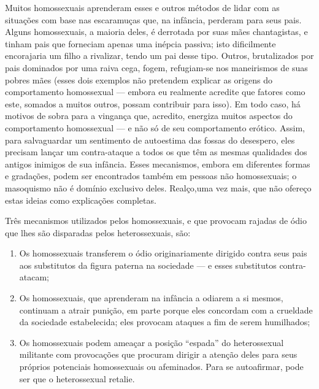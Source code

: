 Muitos homossexuais aprenderam esses e outros métodos de lidar com
as situações com base nas escaramuças que, na infância, perderam para
seus pais.\idxrelpchomo{} Alguns homossexuais, a maioria deles, é derrotada por suas
mães\idxmaeshomo{} chantagistas,\idxhomosexpe{} e tinham pais que forneciam apenas uma inépcia
passiva; isto dificilmente encorajaria um filho a rivalizar, tendo um
pai desse tipo. Outros, brutalizados por pais dominados por uma raiva
cega, fogem, refugiam-se nos maneirismos de suas pobres mães (esses
dois exemplos não pretendem explicar as origens do comportamento
homossexual --- embora eu realmente acredite que fatores como este,
somados a muitos outros, possam contribuir para isso). Em todo caso,
há motivos de sobra para a vingança que,\idxvingahom{} acredito, energiza muitos
aspectos do comportamento homossexual --- e não só de seu
comportamento erótico. Assim, para salvaguardar um sentimento de
autoestima das fossas do desespero, eles precisam lançar um
contra-ataque a todos os que têm as mesmas qualidades dos antigos
inimigos de sua infância. Esses mecanismos, embora em diferentes formas
e gradações, podem ser encontrados também em pessoas não homossexuais;
o masoquismo não é domínio exclusivo deles. Realço,\idxhosthomo[|)] uma vez mais, que
não ofereço estas ideias como explicações completas.

Três mecanismos utilizados pelos homossexuais, e que provocam
rajadas de ódio que lhes são disparadas pelos heterossexuais, são:

\begin{enumerate}
\item Os homossexuais transferem o ódio originariamente dirigido contra
seus pais aos substitutos da figura paterna na sociedade --- e esses
substitutos contra-atacam;

\item Os homossexuais, que aprenderam na infância a odiarem a si
mesmos, continuam a atrair punição, em parte porque eles concordam com
a crueldade da sociedade estabelecida; eles provocam ataques a fim de
serem humilhados;

\item Os homossexuais podem ameaçar a posição
``espada'' do heterossexual militante com
provocações que procuram dirigir a atenção deles para seus próprios
potenciais homossexuais ou afeminados.\idxhomosafem{} Para se autoafirmar, pode ser
que o heterossexual retalie.
\end{enumerate}

